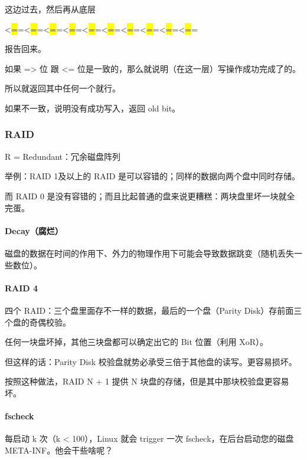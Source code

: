 \documentclass[
]{article}
\begin{document}
这边过去，然后再从底层

\textless{}\hl{=}=\textless{}\hl{=}=\textless{}\hl{=}=\textless{}\hl{=}=\textless{}\hl{=}=\textless{}\hl{=}=\textless{}\hl{=}=\textless{}\hl{=}=\textless{}\hl{=}=\textless{}\hl{=}=

报告回来。

如果 =\textgreater{} 位 跟 \textless=
位是一致的，那么就说明（在这一层）写操作成功完成了的。

所以就返回其中任何一个就行。

如果不一致，说明没有成功写入，返回 old bit。

\hypertarget{header-n105}{%
\subsubsection{RAID}\label{header-n105}}

R = Redundant：冗余磁盘阵列

举例：RAID 1及以上的 RAID 是可以容错的；同样的数据向两个盘中同时存储。

而 RAID 0
是没有容错的；而且比起普通的盘来说更糟糕：两块盘里坏一块就全完蛋。

\hypertarget{header-n109}{%
\paragraph{Decay（腐烂）}\label{header-n109}}

磁盘的数据在时间的作用下、外力的物理作用下可能会导致数据跳变（随机丢失一些数位）。

\hypertarget{header-n111}{%
\paragraph{RAID 4}\label{header-n111}}

四个 RAID：三个盘里面存不一样的数据，最后的一个盘（Parity
Disk）存前面三个盘的奇偶校验。

任何一块盘坏掉，其他三块盘都可以确定出它的 Bit 位置（利用 XoR）。

但这样的话：Parity Disk 校验盘就势必承受三倍于其他盘的读写。更容易损坏。

按照这种做法，RAID N + 1 提供 N 块盘的存储，但是其中那块校验盘更容易坏。

\hypertarget{header-n116}{%
\paragraph{fscheck}\label{header-n116}}

每启动 k 次（k \textless{} 100），Linux 就会 trigger 一次
fscheck，在后台启动您的磁盘 META-INF。他会干些啥呢？
\end{document}
